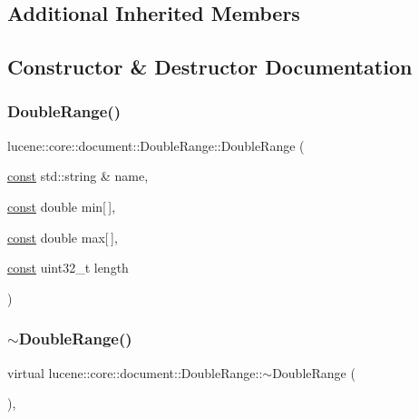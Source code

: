\subsection*{Additional Inherited Members}


\subsection{Constructor \& Destructor Documentation}
\mbox{\label{classlucene_1_1core_1_1document_1_1DoubleRange_ac6c5423e8f054367ecd48401865f5ab5}} 
\subsubsection{\texorpdfstring{Double\+Range()}{DoubleRange()}}
{\footnotesize\ttfamily lucene\+::core\+::document\+::\+Double\+Range\+::\+Double\+Range (\begin{DoxyParamCaption}\item[{\mbox{\hyperlink{ZlibCrc32_8h_a2c212835823e3c54a8ab6d95c652660e}{const}} std\+::string \&}]{name,  }\item[{\mbox{\hyperlink{ZlibCrc32_8h_a2c212835823e3c54a8ab6d95c652660e}{const}} double}]{min\mbox{[}$\,$\mbox{]},  }\item[{\mbox{\hyperlink{ZlibCrc32_8h_a2c212835823e3c54a8ab6d95c652660e}{const}} double}]{max\mbox{[}$\,$\mbox{]},  }\item[{\mbox{\hyperlink{ZlibCrc32_8h_a2c212835823e3c54a8ab6d95c652660e}{const}} uint32\+\_\+t}]{length }\end{DoxyParamCaption})\hspace{0.3cm}{\ttfamily [inline]}}

\mbox{\label{classlucene_1_1core_1_1document_1_1DoubleRange_a45fd069e037e7bc951603fe5376b1554}} 
\subsubsection{\texorpdfstring{$\sim$\+Double\+Range()}{~DoubleRange()}}
{\footnotesize\ttfamily virtual lucene\+::core\+::document\+::\+Double\+Range\+::$\sim$\+Double\+Range (\begin{DoxyParamCaption}{ }\end{DoxyParamCaption})\hspace{0.3cm}{\ttfamily [inline]}, {\ttfamily [virtual]}}



